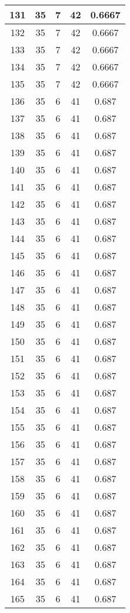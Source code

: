 \documentclass[letterpaper, 12pt]{article}
\begin{document}
\begin{longtable}{|c|c|c|c|c|}
\hline
131 & 35 & 7 & 42 & 0.6667 \\
\hline
132 & 35 & 7 & 42 & 0.6667 \\
\hline
133 & 35 & 7 & 42 & 0.6667 \\
\hline
134 & 35 & 7 & 42 & 0.6667 \\
\hline
135 & 35 & 7 & 42 & 0.6667 \\
\hline
136 & 35 & 6 & 41 & 0.687 \\
\hline
137 & 35 & 6 & 41 & 0.687 \\
\hline
138 & 35 & 6 & 41 & 0.687 \\
\hline
139 & 35 & 6 & 41 & 0.687 \\
\hline
140 & 35 & 6 & 41 & 0.687 \\
\hline
141 & 35 & 6 & 41 & 0.687 \\
\hline
142 & 35 & 6 & 41 & 0.687 \\
\hline
143 & 35 & 6 & 41 & 0.687 \\
\hline
144 & 35 & 6 & 41 & 0.687 \\
\hline
145 & 35 & 6 & 41 & 0.687 \\
\hline
146 & 35 & 6 & 41 & 0.687 \\
\hline
147 & 35 & 6 & 41 & 0.687 \\
\hline
148 & 35 & 6 & 41 & 0.687 \\
\hline
149 & 35 & 6 & 41 & 0.687 \\
\hline
150 & 35 & 6 & 41 & 0.687 \\
\hline
151 & 35 & 6 & 41 & 0.687 \\
\hline
152 & 35 & 6 & 41 & 0.687 \\
\hline
153 & 35 & 6 & 41 & 0.687 \\
\hline
154 & 35 & 6 & 41 & 0.687 \\
\hline
155 & 35 & 6 & 41 & 0.687 \\
\hline
156 & 35 & 6 & 41 & 0.687 \\
\hline
157 & 35 & 6 & 41 & 0.687 \\
\hline
158 & 35 & 6 & 41 & 0.687 \\
\hline
159 & 35 & 6 & 41 & 0.687 \\
\hline
160 & 35 & 6 & 41 & 0.687 \\
\hline
161 & 35 & 6 & 41 & 0.687 \\
\hline
162 & 35 & 6 & 41 & 0.687 \\
\hline
163 & 35 & 6 & 41 & 0.687 \\
\hline
164 & 35 & 6 & 41 & 0.687 \\
\hline
165 & 35 & 6 & 41 & 0.687 \\

\end{longtable}
\end{document}
